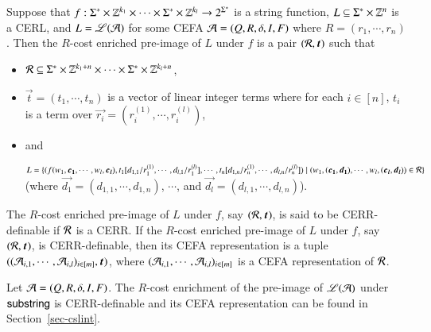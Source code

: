 \begin{definition}
Suppose that $f: \Sigma^* \times \mathbb{Z}^{k_1} \times \cdots \times \Sigma^* \times \mathbb{Z}^{k_l} \rightarrow 2^{\Sigma^*}$ is a string function, $L \subseteq \Sigma^* \times \mathbb{Z}^n$ is a CERL, and $L = \mathscr{L}(\mathcal{A})$ for some CEFA $\mathcal{A}=(Q, R, \delta, I, F)$ where $R= (r_1, \cdots, r_n)$. Then the $R$-cost enriched pre-image of $L$ under $f$ is a pair $(\cR, \vec{t})$ such that 
\begin{itemize}
\item $\mathcal{R} \subseteq \Sigma^* \times \mathbb{Z}^{k_1 + n} \times \cdots \times \Sigma^* \times \mathbb{Z}^{k_l + n}$,
\item $\vec{t} = (t_1, \cdots ,t_n)$ is a vector of linear integer terms where for each $i \in [n]$, $t_i$ is a term over $\vec{r_i} = (r^{(1)}_i, \cdots, r^{(l)}_i)$,
\item and 

$L = \{(f(w_1, \vec{c_1}, \cdots, w_l, \vec{c_l}), t_1[d_{1,1}/r^{(1)}_1, \cdots, d_{l, 1}/r^{(l)}_1], \cdots, t_n[d_{1,n}/r^{(1)}_n, \cdots, d_{l, n}/r^{(l)}_n]) \mid (w_1, (\vec{c_1}, \vec{d_1}), \cdots, w_l, (\vec{c_l}, \vec{d_l})) \in \cR\}$ 
%
(where $\vec{d_1}=(d_{1,1}, \cdots, d_{1,n})$, $\cdots$, and $\vec{d_l}=(d_{l,1},\cdots, d_{l,n})$).
\end{itemize}
The $R$-cost enriched pre-image of $L$ under $f$, say $(\cR, \vec{t})$, is said to be CERR-definable if $\mathcal{R}$ is a CERR. If the $R$-cost enriched pre-image of $L$ under $f$, say $(\cR, \vec{t})$, is CERR-definable,  then its CEFA representation is a tuple $((\NFA_{i,1}, \cdots, \NFA_{i, l})_{i \in [m]}, \vec{t})$, where $(\mathcal{A}_{i,1}, \cdots, \mathcal{A}_{i, l})_{i \in [m]}$ is a CEFA representation of $\mathcal{R}$. 
\end{definition}


\begin{example}
Let $\mathcal{A} = (Q, R, \delta, I, F)$. The $R$-cost enrichment of the pre-image of $\mathscr{L}(\mathcal{A})$ under $\mathsf{substring}$ is CERR-definable and its CEFA representation can be found in Section~\ref{sec-cslint}.
\end{example}




